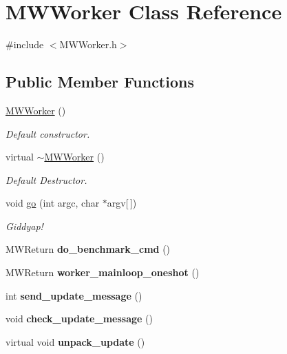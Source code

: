 \hypertarget{classMWWorker}{}\section{M\+W\+Worker Class Reference}
\label{classMWWorker}


{\ttfamily \#include $<$M\+W\+Worker.\+h$>$}

\subsection*{Public Member Functions}
\begin{DoxyCompactItemize}
\item 
\mbox{\label{classMWWorker_a206f250e302ff46e6da8298140268710}} 
\hyperlink{classMWWorker_a206f250e302ff46e6da8298140268710}{M\+W\+Worker} ()
\begin{DoxyCompactList}\small\item\em Default constructor. \end{DoxyCompactList}\item 
\mbox{\label{classMWWorker_a5162af053c4ee7e0e01f680d6792ffa1}} 
virtual \hyperlink{classMWWorker_a5162af053c4ee7e0e01f680d6792ffa1}{$\sim$\+M\+W\+Worker} ()
\begin{DoxyCompactList}\small\item\em Default Destructor. \end{DoxyCompactList}\item 
\mbox{\label{classMWWorker_acd0f3f0d8637352325f1f00919dfeb6f}} 
void \hyperlink{classMWWorker_acd0f3f0d8637352325f1f00919dfeb6f}{go} (int argc, char $\ast$argv\mbox{[}$\,$\mbox{]})
\begin{DoxyCompactList}\small\item\em Giddyap! \end{DoxyCompactList}\item 
\mbox{\label{classMWWorker_aebb56958c01c2cdc0457348c9784b4c2}} 
M\+W\+Return {\bfseries do\+\_\+benchmark\+\_\+cmd} ()
\item 
\mbox{\label{classMWWorker_ab36420a16258463f33625a482c7eda1c}} 
M\+W\+Return {\bfseries worker\+\_\+mainloop\+\_\+oneshot} ()
\item 
\mbox{\label{classMWWorker_abbf8a1d6f324842dc59cc2518b2b91d1}} 
int {\bfseries send\+\_\+update\+\_\+message} ()
\item 
\mbox{\label{classMWWorker_a9aa6c3bf91fc664fae932e4b8e669b45}} 
void {\bfseries check\+\_\+update\+\_\+message} ()
\item 
\mbox{\label{classMWWorker_a5c88f62b7cb0269ec2e9cf25a0fb23b0}} 
virtual void {\bfseries unpack\+\_\+update} ()
\end{DoxyCompactItemize}
